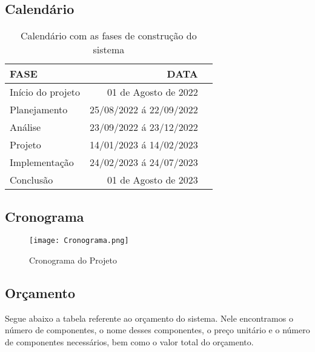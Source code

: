 \subsection{Calend\'{a}rio }

\begin{table}[H]
      \begin{center}
            \caption{Calendário com as fases de construção do sistema} \label{tabela1}
            \begin{tabular}{lrc}
                  \hline
                  FASE              & DATA                    \\
                  \hline
                  Início do projeto & 01 de Agosto de 2022    \\
                  Planejamento      & 25/08/2022 á 22/09/2022 \\
                  Análise           & 23/09/2022 á 23/12/2022 \\
                  Projeto           & 14/01/2023 á 14/02/2023 \\
                  Implementação     & 24/02/2023 á 24/07/2023 \\
                  Conclusão         & 01 de Agosto de 2023    \\
                  \hline
            \end{tabular}
      \end{center}
\end{table}

\subsection{Cronograma }
\begin{figure}[H]
      \begin{center}
            \caption{Cronograma do Projeto } \label{afp}

            \texttt{[image: Cronograma.png]} \\
      \end{center}
\end{figure}



\subsection{Or\c{c}amento } \label{orcamento}
Segue abaixo a tabela referente ao orçamento do sistema. Nele encontramos o número de componentes, o nome desses componentes, o preço unitário e o número de componentes necessários, bem como o valor total do orçamento.


